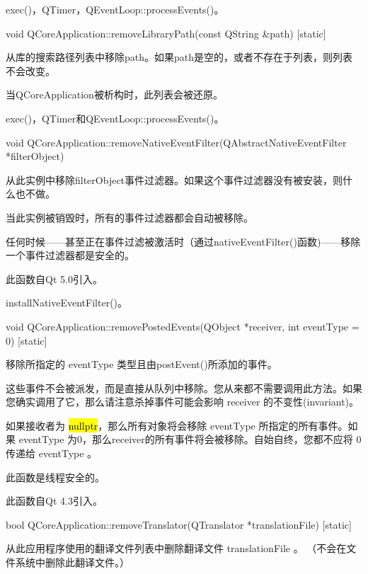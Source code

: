 \begin{notice}[另请参阅]
exec()，QTimer，QEventLoop::processEvents()。
\end{notice}

void QCoreApplication::removeLibraryPath(const QString \&path) [static]

从库的搜索路径列表中移除path。如果path是空的，或者不存在于列表，则列表不会改变。

当QCoreApplication被析构时，此列表会被还原。


\begin{notice}[另请参阅]
exec()，QTimer和QEventLoop::processEvents()。
\end{notice}


void QCoreApplication::removeNativeEventFilter(QAbstractNativeEventFilter *filterObject)

从此实例中移除filterObject事件过滤器。如果这个事件过滤器没有被安装，则什么也不做。

当此实例被销毁时，所有的事件过滤器都会自动被移除。

任何时候——甚至正在事件过滤被激活时（通过nativeEventFilter()函数)——移除一个事件过滤器都是安全的。

此函数自Qt 5.0引入。



\begin{notice}[另请参阅]
installNativeEventFilter()。
\end{notice}


void QCoreApplication::removePostedEvents(QObject *receiver, int eventType = 0) [static]

移除所指定的 eventType 类型且由postEvent()所添加的事件。

这些事件不会被派发，而是直接从队列中移除。您从来都不需要调用此方法。如果您确实调用了它，那么请注意杀掉事件可能会影响 receiver 的不变性(invariant)。

如果接收者为 \hl{nullptr}，那么所有对象将会移除 eventType 所指定的所有事件。如果 eventType 为0，那么receiver的所有事件将会被移除。自始自终，您都不应将 0 传递给 eventType 。


\begin{notice}
此函数是线程安全的。
\end{notice}

此函数自Qt 4.3引入。

bool QCoreApplication::removeTranslator(QTranslator *translationFile) [static]

从此应用程序使用的翻译文件列表中删除翻译文件 translationFile 。 （不会在文件系统中删除此翻译文件。）


